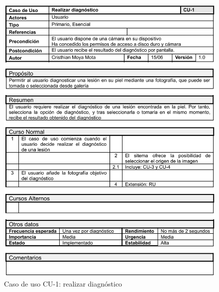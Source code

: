   \begin{figure}[H]
	\centering
	\includegraphics[scale=0.81]{imagenes/cu-1.png}
	\caption{Caso de uso CU-1: realizar diagnóstico}
	\label{fig:cu1}
\end{figure}


